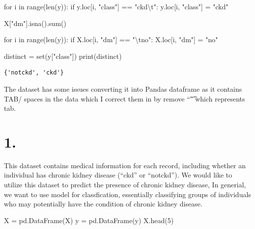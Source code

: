 \documentclass[
  11pt,
  letterpaper,
  DIV=11,
  numbers=noendperiod]{scrartcl}
\newenvironment{Shaded}{\begin{snugshade}}{\end{snugshade}}
\newcommand{\BuiltInTok}[1]{\textcolor[rgb]{0.00,0.23,0.31}{#1}}
\newcommand{\CharTok}[1]{\textcolor[rgb]{0.13,0.47,0.30}{#1}}
\newcommand{\ControlFlowTok}[1]{\textcolor[rgb]{0.00,0.23,0.31}{#1}}
\newcommand{\DecValTok}[1]{\textcolor[rgb]{0.68,0.00,0.00}{#1}}
\newcommand{\KeywordTok}[1]{\textcolor[rgb]{0.00,0.23,0.31}{#1}}
\newcommand{\NormalTok}[1]{\textcolor[rgb]{0.00,0.23,0.31}{#1}}
\newcommand{\OperatorTok}[1]{\textcolor[rgb]{0.37,0.37,0.37}{#1}}
\newcommand{\StringTok}[1]{\textcolor[rgb]{0.13,0.47,0.30}{#1}}
\begin{document}
\begin{Shaded}
\begin{Highlighting}[]
\ControlFlowTok{for}\NormalTok{ i }\KeywordTok{in} \BuiltInTok{range}\NormalTok{(}\BuiltInTok{len}\NormalTok{(y)):}
    \ControlFlowTok{if}\NormalTok{ y.loc[i, }\StringTok{"class"}\NormalTok{] }\OperatorTok{==} \StringTok{"ckd}\CharTok{\textbackslash{}t}\StringTok{"}\NormalTok{:}
\NormalTok{        y.loc[i, }\StringTok{"class"}\NormalTok{] }\OperatorTok{=} \StringTok{"ckd"}

\NormalTok{X[}\StringTok{"dm"}\NormalTok{].isna().}\BuiltInTok{sum}\NormalTok{()}




\ControlFlowTok{for}\NormalTok{ i }\KeywordTok{in} \BuiltInTok{range}\NormalTok{(}\BuiltInTok{len}\NormalTok{(y)):}
    \ControlFlowTok{if}\NormalTok{ X.loc[i, }\StringTok{"dm"}\NormalTok{] }\OperatorTok{==} \StringTok{"}\CharTok{\textbackslash{}t}\StringTok{no"}\NormalTok{:}
\NormalTok{        X.loc[i, }\StringTok{"dm"}\NormalTok{] }\OperatorTok{=} \StringTok{"no"}

\NormalTok{distinct }\OperatorTok{=} \BuiltInTok{set}\NormalTok{(y[}\StringTok{"class"}\NormalTok{])}
\BuiltInTok{print}\NormalTok{(distinct)}
\end{Highlighting}
\end{Shaded}

\begin{verbatim}
{'notckd', 'ckd'}
\end{verbatim}

The dataset has some issues converting it into Pandas dataframe as it
contains TAB/ spaces in the data which I correct them in by remove ``\t"
which represents tab.

\section{1.}\label{section}

This dataset contains medical information for each record, including
whether an individual has chronic kidney disease (``ckd'' or
``notckd''). We would like to utilize this dataset to predict the
presence of chronic kidney disease, In generial, we want to use model
for classfication, essentially classifying groups of individuals who may
potentially have the condition of chronic kidney disease.

\begin{Shaded}
\begin{Highlighting}[]
\NormalTok{X }\OperatorTok{=}\NormalTok{ pd.DataFrame(X)}
\NormalTok{y }\OperatorTok{=}\NormalTok{ pd.DataFrame(y)}
\NormalTok{X.head(}\DecValTok{5}\NormalTok{)}
\end{Highlighting}
\end{Shaded}
\end{document}
